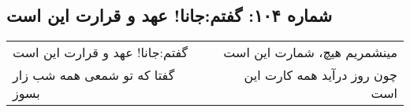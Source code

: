 \begin{center}
\section*{شماره ۱۰۴: گفتم:‌جانا! عهد و قرارت این است}
\label{sec:104}
\begin{longtable}{l p{0.5cm} r}
گفتم:‌جانا! عهد و قرارت این است
&&
مینشمریم هیچ، شمارت این است
\\
گفتا که تو شمعی همه شب زار بسوز
&&
چون روز درآید همه کارت این است
\\
\end{longtable}
\end{center}
